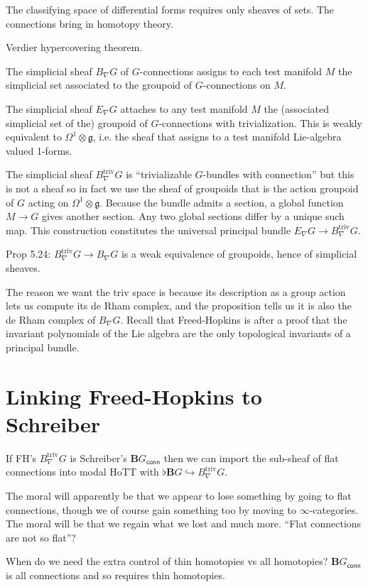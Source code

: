 \documentclass[12pt]{article}
\newcommand{\bg}{\ensuremath{\textbf{B}G}}
\newcommand{\bgconn}{\ensuremath{\textbf{B}G_{\textsf{conn}}}}
\begin{document}
The classifying space of differential forms requires only sheaves of sets. The connections bring in homotopy theory.

Verdier hypercovering theorem.

The simplicial sheaf $B_{\nabla}G$ of $G$-connections assigns to each test manifold $M$ the simplicial set associated to the groupoid of $G$-connections on $M$.

The simplicial sheaf $E_{\nabla}G$ attaches to any test manifold $M$ the (associated simplicial set of the) groupoid of $G$-connections with trivialization. This is weakly equivalent to $\Omega^1 \otimes\mathfrak{g}$, i.e. the sheaf that assigns to a test manifold Lie-algebra valued 1-forms.

The simplicial sheaf $B_{\nabla}^{\mathrm{triv}}G$ is ``trivializable $G$-bundles with connection'' but this is not a sheaf so in fact we use the sheaf of groupoids that is the action groupoid of $G$ acting on $\Omega^1 \otimes\mathfrak{g}$. Because the bundle admits a section, a global function $M\to G$ gives another section. Any two global sections differ by a unique such map. This construction constitutes the universal principal bundle $E_{\nabla}G \to B_{\nabla}^{\mathrm{triv}}G$.

Prop 5.24:  $B_{\nabla}^{\mathrm{triv}}G\to B_{\nabla}G$ is a weak equivalence of groupoids, hence of simplicial sheaves.

The reason we want the triv space is because its description as a group action lets us compute its de Rham complex, and the proposition tells us it is also the de Rham complex of $B_{\nabla}G$. Recall that Freed-Hopkins is after a proof that the invariant polynomials of the Lie algebra are the only topological invariants of a principal bundle.

\section{Linking Freed-Hopkins to Schreiber}
If FH's $B_{\nabla}^{\mathrm{triv}}G$ is Schreiber's $\bgconn$ then we can import the sub-sheaf of flat connections into modal HoTT with $\flat\bg\hookrightarrow B_{\nabla}^{\mathrm{triv}}G$.

The moral will apparently be that we appear to lose something by going to flat connections, though we of course gain something too by moving to $\infty$-categories. The moral will be that we regain what we lost and much more. ``Flat connections are not so flat''?

When do we need the extra control of thin homotopies vs all homotopies? $\bgconn$ is all connections and so requires thin homotopies.
\end{document}
